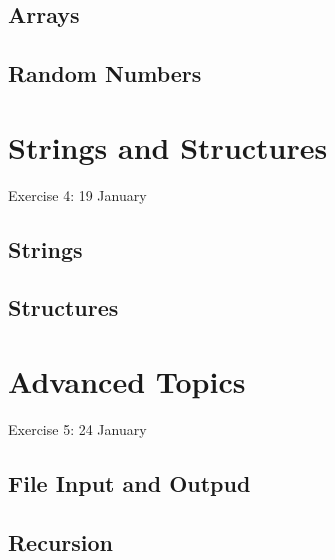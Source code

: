 \documentclass{report}
\begin{document}
\section{Arrays}
\section{Random Numbers}



\chapter{Strings and Structures}
Exercise 4: 19 January 
\section{Strings}
\section{Structures}


\chapter{Advanced Topics}
Exercise 5: 24 January
\section{File Input and Outpud}
\section{Recursion}
\end{document}

